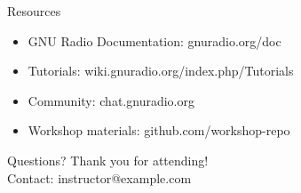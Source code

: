 \documentclass[aspectratio=169,11pt]{beamer}
\begin{document}
\begin{frame}{Resources}
\begin{itemize}
    \item GNU Radio Documentation: gnuradio.org/doc
    \item Tutorials: wiki.gnuradio.org/index.php/Tutorials
    \item Community: chat.gnuradio.org
    \item Workshop materials: github.com/workshop-repo
\end{itemize}
\end{frame}

\begin{frame}{Questions?}
\centering
\Large Thank you for attending!\\[1em]
\normalsize
Contact: instructor@example.com
\end{frame}
\end{document}
